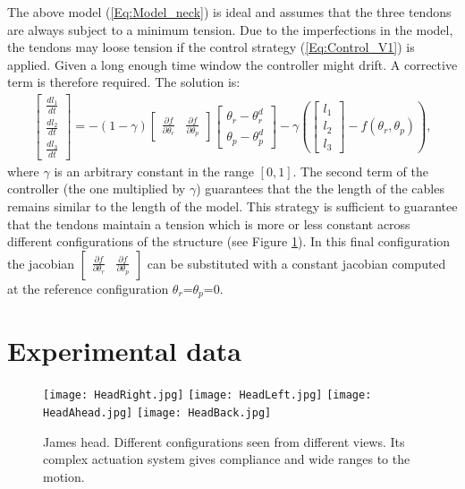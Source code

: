 \documentclass[9pt]{amsart}
\theoremstyle{definition}
\theoremstyle{remark}
\numberwithin{equation}{section}
\begin{document}
The above model (\ref{Eq:Model_neck}) is ideal and assumes that the three tendons are always subject to a minimum tension. Due to the imperfections in the model, the tendons may loose tension if the control strategy (\ref{Eq:Control_V1}) is applied. Given a long enough time window the controller might drift. A corrective term is therefore required. The solution is:
\begin{eqnarray} \label{Eq:Control_V2}
\begin{bmatrix}
\frac{d l_1}{dt}\\
\frac{d l_2}{dt}\\
\frac{d l_3}{dt}
\end{bmatrix} = -(1-\gamma)\begin{bmatrix} \frac{\partial f} {\partial \theta_r} &  \frac{\partial f} {\partial \theta_p} \end{bmatrix}
 \begin{bmatrix}
\theta_r - \theta_r^d\\
\theta_p - \theta_p^d
\end{bmatrix} - \gamma \left( \begin{bmatrix} l_1\\
l_2\\
l_3
\end{bmatrix} - f(\theta_r, \theta_p) \right),
\end{eqnarray}
where $\gamma$ is an arbitrary constant in the range $[0, 1]$. The second term of the controller (the one multiplied by $\gamma$) guarantees that the the length of the cables remains similar to the length of the model. This strategy is sufficient to guarantee that the tendons maintain a tension which is more or less constant across different configurations of the structure (see Figure \ref{Fig:HeadPos}). In this final configuration the jacobian $\begin{bmatrix} \frac{\partial f} {\partial \theta_r} &  \frac{\partial f} {\partial \theta_p} \end{bmatrix}$ can be substituted with a constant jacobian computed at the reference configuration $\theta_r$=$\theta_p$=0.


\section{Experimental data} \label{Sec:ExpData}

\begin{figure}[tbp]
\centering
\texttt{[image: HeadRight.jpg]} \hspace{1pt}
\texttt{[image: HeadLeft.jpg]} \hspace{1pt}
\texttt{[image: HeadAhead.jpg]} \hspace{1pt}
\texttt{[image: HeadBack.jpg]} \hspace{1pt}\\

\caption{James head. Different configurations seen from different views. Its complex actuation system gives compliance and wide ranges to the motion.}
\label{Fig:HeadPos}
\end{figure}
\end{document}
